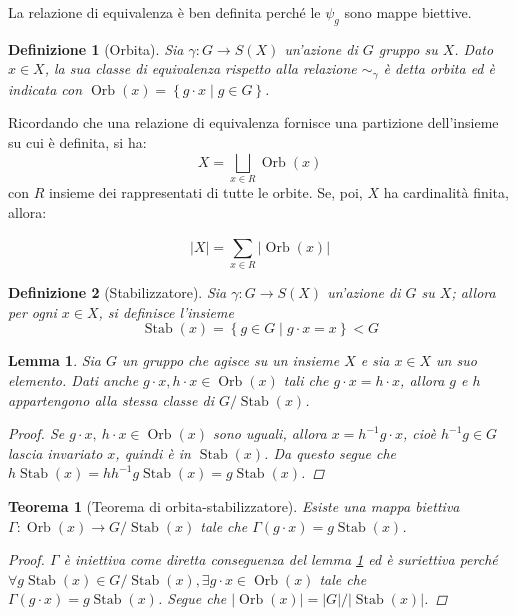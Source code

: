 \documentclass[12pt]{scrartcl}
\theoremstyle{style}
\newtheorem{definizione}{Definizione}[section]
\newtheorem{teorema}{Teorema}[section]
\newtheorem{lemma}{Lemma}[teorema]
\newenvironment{boxenv}[1][]{
    \begin{eqbox}[#1]
    }{
   \end{eqbox}
}
\numberwithin{equation}{subsection}
\begin{document}
La relazione di equivalenza \`e ben definita perch\'e le $\psi _g$ sono mappe biettive.
\begin{definizione}
	[Orbita]
	Sia $\gamma :G \to S(X)$ un'azione di $G$ gruppo su $X$. Dato $x \in X$, la sua classe di equivalenza rispetto alla relazione $\sim _\gamma$ \`e detta \textit{orbita} ed \`e indicata con $\operatorname{Orb} (x) = \left\{ g \cdot  x  \mid g \in G\right\} $.
\end{definizione}
\noindent Ricordando che una relazione di equivalenza fornisce una partizione dell'insieme su cui \`e definita, si ha:
\begin{equation}
	X = \bigsqcup_{x \in R} \operatorname{Orb} (x)
\end{equation}
con $R$ insieme dei rappresentati di tutte le orbite.
Se, poi, $X$ ha cardinalit\`a finita, allora:
\begin{boxenv}[]
\begin{equation}
	\lvert X \rvert  = \sum_{x \in R}^{} \lvert \operatorname{Orb} (x) \rvert 
\end{equation}
\end{boxenv}
\begin{definizione}
	[Stabilizzatore]
	Sia $\gamma: G \to S(X)$ un'azione di $G$ su $X$; allora per ogni $x \in X$, si definisce l'insieme 
	\[
	\operatorname{Stab} (x) = \left\{ g \in G  \mid g \cdot  x = x \right\} < G 
	\] 	
\end{definizione}
\begin{lemma}\label{l111}
	Sia $G$ un gruppo che agisce su un insieme $X$ e sia $x \in X$ un suo elemento. Dati anche $g\cdot x , h \cdot x \in \operatorname{Orb} (x)$ tali che $g \cdot x = h\cdot x$, allora $g$ e $h$ appartengono alla stessa classe di $G / \operatorname{Stab} (x)$.
\begin{proof}
	Se $g \cdot x, \ h\cdot x \in \operatorname{Orb} (x)$ sono uguali, allora $x =h^{-1} g \cdot x $, cio\`e $h^{-1} g \in G$ lascia invariato $x$, quindi \`e in $\operatorname{Stab} (x)$.
	Da questo segue che $h \operatorname{Stab} (x) = h h^{-1} g \operatorname{Stab} (x) = g \operatorname{Stab} (x)$.
\end{proof}
\end{lemma}
\begin{teorema}[Teorema di orbita-stabilizzatore]\label{osth}
	Esiste una mappa biettiva $\Gamma : \operatorname{Orb} (x) \to G / \operatorname{Stab} (x)$ tale che $\Gamma(g \cdot x) = g \operatorname{Stab} (x)$.
	\begin{proof}
		$\Gamma$ \`e iniettiva come diretta conseguenza del lemma \ref{l111} ed \`e suriettiva perch\'e $\forall g \operatorname{Stab} (x) \in G / \operatorname{Stab} (x), \exists g\cdot x \in \operatorname{Orb} (x)$ tale che $\Gamma(g\cdot x) = g \operatorname{Stab} (x)$.
		Segue che $\lvert \operatorname{Orb} (x)  \rvert = \lvert G \rvert / \lvert \operatorname{Stab} (x) \rvert $.
	\end{proof}
\end{teorema}
\end{document}
